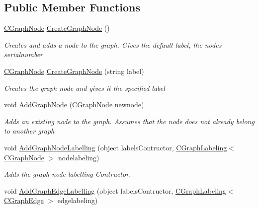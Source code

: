 \subsection*{Public Member Functions}
\begin{DoxyCompactItemize}
\item 
\hyperlink{class_graph_library_1_1_c_graph_node}{C\+Graph\+Node} \hyperlink{class_graph_library_1_1_c_graph_aaf1c7e3fc443585374700fdcb71f0289}{Create\+Graph\+Node} ()
\begin{DoxyCompactList}\small\item\em Creates and adds a node to the graph. Gives the default label, the node\textquotesingle{}s serialnumber \end{DoxyCompactList}\item 
\hyperlink{class_graph_library_1_1_c_graph_node}{C\+Graph\+Node} \hyperlink{class_graph_library_1_1_c_graph_af60c41b8fe601277ec6bb45fcb2768a7}{Create\+Graph\+Node} (string label)
\begin{DoxyCompactList}\small\item\em Creates the graph node and gives it the specified label \end{DoxyCompactList}\item 
void \hyperlink{class_graph_library_1_1_c_graph_a299d93f0be8ed93b1e17817c6f5bf5cc}{Add\+Graph\+Node} (\hyperlink{class_graph_library_1_1_c_graph_node}{C\+Graph\+Node} newnode)
\begin{DoxyCompactList}\small\item\em Adds an existing node to the graph. Assumes that the node does not already belong to another graph \end{DoxyCompactList}\item 
void \hyperlink{class_graph_library_1_1_c_graph_ae7eafc40d87100bf02a189a502ec6881}{Add\+Graph\+Node\+Labelling} (object labels\+Contructor, \hyperlink{class_graph_library_1_1_c_graph_labeling}{C\+Graph\+Labeling}$<$ \hyperlink{class_graph_library_1_1_c_graph_node}{C\+Graph\+Node} $>$ nodelabeling)
\begin{DoxyCompactList}\small\item\em Adds the graph node labelling Contructor. \end{DoxyCompactList}\item 
void \hyperlink{class_graph_library_1_1_c_graph_a44eca07849f3cbb2f28db1fcae27802f}{Add\+Graph\+Edge\+Labelling} (object labels\+Contructor, \hyperlink{class_graph_library_1_1_c_graph_labeling}{C\+Graph\+Labeling}$<$ \hyperlink{class_graph_library_1_1_c_graph_edge}{C\+Graph\+Edge} $>$ edgelabeling)

\end{DoxyCompactItemize}
